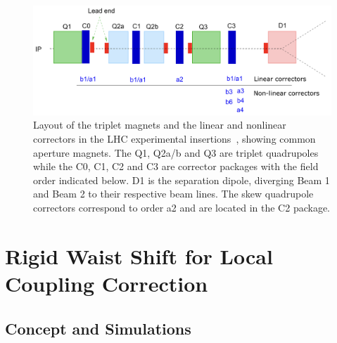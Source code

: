 \begin{figure}
    \centering
    \includegraphics[width=0.9\linewidth]{Figures/IR_Coupling_Correction/corrector_package.png}
    \caption{Layout of the triplet magnets and the linear and nonlinear correctors in the LHC experimental insertions~\cite{CERN:Bruning:Dynap_Studies}, showing common aperture magnets. The Q\num{1}, Q\num{2}a/b and Q\num{3} are triplet quadrupoles while the C\num{0}, C\num{1}, C\num{2} and C\num{3} are corrector packages with the field order indicated below. D\num{1} is the separation dipole, diverging Beam \num{1} and Beam \num{2} to their respective beam lines. The skew quadrupole correctors correspond to order a\num{2} and are located in the C\num{2} package.}
    \label{figure:lhc_corrector_layout}
\end{figure}


\section{Rigid Waist Shift for Local Coupling Correction}

\subsection{Concept and Simulations}

